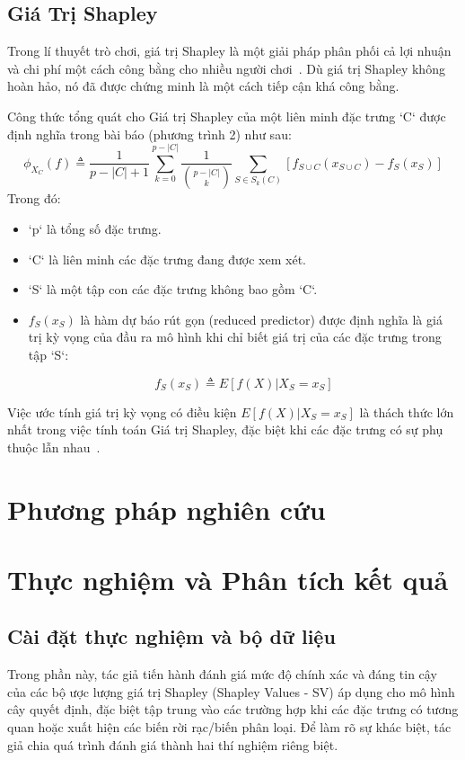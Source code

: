 \documentclass[12pt, a4paper]{article}
\begin{document}
\subsection{Giá Trị Shapley}
Trong lí thuyết trò chơi, giá trị Shapley là một giải pháp phân phối cả lợi nhuận và chi phí một cách công bằng cho nhiều người chơi~\citep{Shapley1953}. Dù giá trị Shapley không hoàn hảo, nó đã được chứng minh là một cách tiếp cận khá công bằng.

Công thức tổng quát cho Giá trị Shapley của một liên minh đặc trưng `C` được định nghĩa trong bài báo (phương trình 2) như sau:
$$
\phi_{X_C}(f) \triangleq \frac{1}{p - |C| + 1} \sum_{k=0}^{p-|C|} \frac{1}{\binom{p-|C|}{k}} \sum_{S \in S_k(C)} [f_{S \cup C}(x_{S \cup C}) - f_S(x_S)]
$$
Trong đó:
\begin{itemize}
    \item `p` là tổng số đặc trưng.
    \item `C` là liên minh các đặc trưng đang được xem xét.
    \item `S` là một tập con các đặc trưng không bao gồm `C`.

    \item $f_S(x_S)$ là hàm dự báo rút gọn (reduced predictor) được định nghĩa là giá trị kỳ vọng của đầu ra mô hình khi chỉ biết giá trị của các đặc trưng trong tập `S`:
    
    $$
    f_S(x_S) \triangleq E[f(X) | X_S = x_S]
    $$

\end{itemize}
Việc ước tính giá trị kỳ vọng có điều kiện $E[f(X) | X_S = x_S]$ là thách thức lớn nhất trong việc tính toán Giá trị Shapley, đặc biệt khi các đặc trưng có sự phụ thuộc lẫn nhau~\citep{Aas2020}.


\section{Phương pháp nghiên cứu}

\section{Thực nghiệm và Phân tích kết quả}
\subsection{Cài đặt thực nghiệm và bộ dữ liệu}

Trong phần này, tác giả tiến hành đánh giá mức độ chính xác và đáng tin cậy của các bộ ược lượng giá trị Shapley (Shapley Values - SV) áp dụng cho mô hình cây quyết định, đặc biệt tập trung vào các trường hợp khi các đặc trưng có tương quan hoặc xuất hiện các biến rời rạc/biến phân loại. Để làm rõ sự khác biệt, tác giả chia quá trình đánh giá thành hai thí nghiệm riêng biệt.
\end{document}
